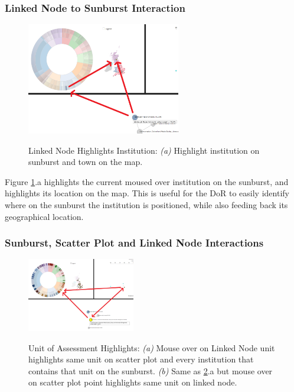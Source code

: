 \documentclass[a4paper, 11pt]{article}
\begin{document}
\subsubsection{Linked Node to Sunburst Interaction}
\begin{figure}[hbt!]
	\centering
      \includegraphics[width=0.6\textwidth]{imgs/sb_ln_int/LN_SB_Institute_map_highlight.png} \\
	\caption{Linked Node Highlights Institution: 
	\textit{(a)} Highlight institution on sunburst and town on the map.}
    \label{fig:ln_sb_int:institution_town_highlight}
     \noindent\makebox[\linewidth]{\rule{\textwidth}{0.4pt}}
\end{figure}

\noindent Figure \ref{fig:ln_sb_int:institution_town_highlight}.a highlights the current moused over institution on the sunburst, and highlights its location on the map. This is useful for the DoR to easily identify where on the sunburst the institution is positioned, while also feeding back its geographical location.


\subsubsection{Sunburst, Scatter Plot and Linked Node Interactions}
\begin{figure}[hbt!]
	\centering
      \includegraphics[width=0.42\textwidth]{imgs/sb_sc_ln_int/3_way_topic_highlight.png} \\
	\caption{Unit of Assessment Highlights: 
	\textit{(a)} Mouse over on Linked Node unit highlights same unit on scatter plot and every institution that contains that unit on the sunburst.
	\textit{(b)} Same as \ref{fig:sb_sc_ln_int:3_way_topic_highlight}.a but mouse over on scatter plot point highlights same unit on linked node.}
    \label{fig:sb_sc_ln_int:3_way_topic_highlight}
     \noindent\makebox[\linewidth]{\rule{\textwidth}{0.4pt}}
\end{figure}
\end{document}
